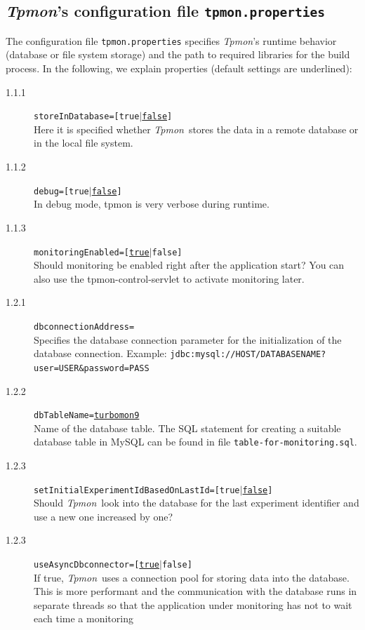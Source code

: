 \documentclass[a4paper,12pt]{scrartcl}
\newcommand{\tpmon}{\textit{Tpmon}}
\begin{document}
\subsection{\tpmon's configuration file \texttt{tpmon.properties}}\label{sec.tpmon.properties}

The configuration file \texttt{tpmon.properties} specifies \tpmon's runtime behavior (database or file system 
storage) and the path to required libraries for the build process. In the following, we explain properties (default settings are underlined):

\begin{description}
 \item [1.1.1] \texttt{storeInDatabase=[true$|$\underline{false}]} \\
Here it is specified whether \tpmon\ stores the data in a remote database or in the local file system. 
\item [1.1.2] \texttt{debug=[true$|$\underline{false}]}  \\
In debug mode, tpmon is very verbose during runtime.
\item [1.1.3] \texttt{monitoringEnabled=[\underline{true}$|$false]} \\
Should monitoring be enabled right after the application start? You can also use the tpmon-control-servlet
to activate monitoring later.
\item [1.2.1] \texttt{dbconnectionAddress=} \\
Specifies the database connection parameter for the initialization of the database connection. Example: 
\small
\texttt{jdbc:mysql://HOST/DATABASENAME?user=USER\&password=PASS}
\normalsize
\item [1.2.2] \texttt{dbTableName=\underline{turbomon9}} \\
Name of the database table. The SQL statement for creating a suitable database table
in MySQL can be found in file \small \texttt{table-for-monitoring.sql}\normalsize.
\item [1.2.3] \texttt{setInitialExperimentIdBasedOnLastId=[true$|$\underline{false}]} \\
Should \tpmon\ look into the database for the last experiment identifier and use a new one increased by one?
\item [1.2.3] \texttt{useAsyncDbconnector=[\underline{true}$|$false]} \\
If true, \tpmon\ uses a connection pool for storing data into the database. This is more performant and the communication
with the database runs in separate threads so that the application under monitoring has not to wait each time a monitoring

\end{description}
\end{document}
